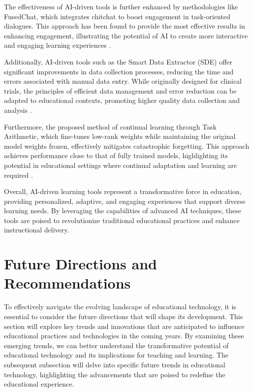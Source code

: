 The effectiveness of AI-driven tools is further enhanced by methodologies like FusedChat, which integrates chitchat to boost engagement in task-oriented dialogues. This approach has been found to provide the most effective results in enhancing engagement, illustrating the potential of AI to create more interactive and engaging learning experiences \cite{stricker2024enhancingtaskorienteddialogueschitchat}.



Additionally, AI-driven tools such as the Smart Data Extractor (SDE) offer significant improvements in data collection processes, reducing the time and errors associated with manual data entry. While originally designed for clinical trials, the principles of efficient data management and error reduction can be adapted to educational contexts, promoting higher quality data collection and analysis \cite{quennelle2023smartdataextractorclinician}.



Furthermore, the proposed method of continual learning through Task Arithmetic, which fine-tunes low-rank weights while maintaining the original model weights frozen, effectively mitigates catastrophic forgetting. This approach achieves performance close to that of fully trained models, highlighting its potential in educational settings where continual adaptation and learning are required \cite{chitale2023taskarithmeticloracontinual}.



Overall, AI-driven learning tools represent a transformative force in education, providing personalized, adaptive, and engaging experiences that support diverse learning needs. By leveraging the capabilities of advanced AI techniques, these tools are poised to revolutionize traditional educational practices and enhance instructional delivery.












\section{Future Directions and Recommendations} \label{sec:Future Directions and Recommendations}

To effectively navigate the evolving landscape of educational technology, it is essential to consider the future directions that will shape its development. This section will explore key trends and innovations that are anticipated to influence educational practices and technologies in the coming years. By examining these emerging trends, we can better understand the transformative potential of educational technology and its implications for teaching and learning. The subsequent subsection will delve into specific future trends in educational technology, highlighting the advancements that are poised to redefine the educational experience.






